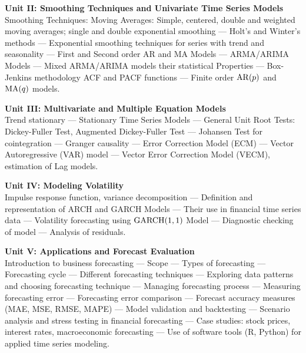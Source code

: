 \vspace{0.3em}
\noindent\textbf{Unit II: Smoothing Techniques and Univariate Time Series Models}\\
\small
Smoothing Techniques: Moving Averages: Simple, centered, double and weighted moving averages; single and double exponential smoothing --- Holt's and Winter's methods --- Exponential smoothing techniques for series with trend and seasonality --- First and Second order AR and MA Models --- ARMA/ARIMA Models --- Mixed ARMA/ARIMA models their statistical Properties --- Box-Jenkins methodology ACF and PACF functions --- Finite order $\operatorname{AR}(p)$ and $\operatorname{MA}(q)$ models.
\normalsize

\vspace{0.3em}
\noindent\textbf{Unit III: Multivariate and Multiple Equation Models}\\
\small
Trend stationary --- Stationary Time Series Models --- General Unit Root Tests: Dickey-Fuller Test, Augmented Dickey-Fuller Test --- Johansen Test for cointegration --- Granger causality --- Error Correction Model (ECM) --- Vector Autoregressive (VAR) model --- Vector Error Correction Model (VECM), estimation of Lag models.
\normalsize

\vspace{0.3em}
\noindent\textbf{Unit IV: Modeling Volatility}\\
\small
Impulse response function, variance decomposition --- Definition and representation of ARCH and GARCH Models --- Their use in financial time series data --- Volatility forecasting using $\operatorname{GARCH}(1,1)$ Model --- Diagnostic checking of model --- Analysis of residuals.
\normalsize

\vspace{0.3em}
\noindent\textbf{Unit V: Applications and Forecast Evaluation}\\
\small
Introduction to business forecasting --- Scope --- Types of forecasting --- Forecasting cycle --- Different forecasting techniques --- Exploring data patterns and choosing forecasting technique --- Managing forecasting process --- Measuring forecasting error --- Forecasting error comparison --- Forecast accuracy measures (MAE, MSE, RMSE, MAPE) --- Model validation and backtesting --- Scenario analysis and stress testing in financial forecasting --- Case studies: stock prices, interest rates, macroeconomic forecasting --- Use of software tools (R, Python) for applied time series modeling.
\normalsize

